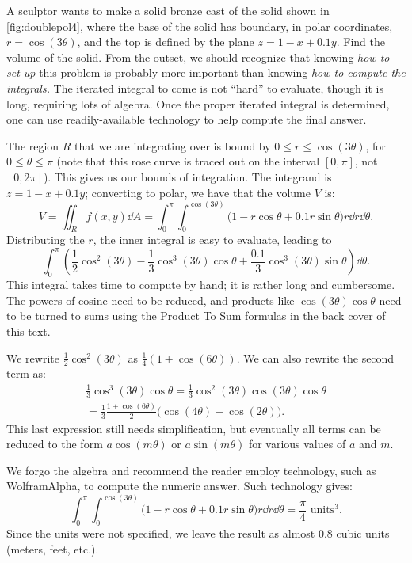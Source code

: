 \begin{example}\label{ex_doublepol4}%
A sculptor wants to make a solid bronze cast of the solid shown in \autoref{fig:doublepol4}, where the base of the solid has boundary, in polar coordinates, $r=\cos(3\theta)$, and the top is defined by the plane $z=1-x+0.1y$. Find the volume of the solid.
\solution
From the outset, we should recognize that knowing \emph{how to set up} this problem is probably more important than knowing \emph{how to compute the integrals.} The iterated integral to come is not ``hard'' to evaluate, though it is long, requiring lots of algebra. Once the proper iterated integral is determined, one can use readily-available technology to help compute the final answer. 

The region $R$ that we are integrating over is bound by $0\leq r\leq \cos(3\theta)$, for $0\leq \theta\leq\pi$ (note that this rose curve is traced out on the interval $[0,\pi]$, not $[0,2\pi]$). This gives us our bounds of integration. The integrand is $z=1-x+0.1y$; converting to polar, we have that the volume $V$ is:
\[V = \iint_R f(x,y)\dd A = \int_0^\pi\int_0^{\cos(3\theta)}\bigl(1-r\cos\theta+0.1r\sin\theta\bigr)r\dd r\dd\theta.\]
Distributing the $r$, the inner integral is easy to evaluate, leading to 
\[ \int_0^\pi \left(\frac12\cos^2(3\theta)-\frac13\cos^3(3\theta)\cos\theta
+\frac{0.1}3\cos^3(3\theta)\sin\theta\right)\dd\theta.\]
This integral takes time to compute by hand; it is rather long and cumbersome. The powers of cosine need to be reduced, and products like $\cos(3\theta)\cos\theta$ need to be turned to sums using the Product To Sum formulas in the back cover of this text. 

We rewrite $\frac12\cos^2(3\theta)$ as $\frac14(1+\cos(6\theta))$. We can also rewrite the second term as: 
\begin{multline*}
 \frac13\cos^3(3\theta)\cos\theta = \frac13\cos^2(3\theta)\cos(3\theta)\cos\theta\\
 = \frac13\frac{1+\cos(6\theta)}2\bigl(\cos(4\theta)+\cos(2\theta)\bigr).
\end{multline*}
This last expression still needs simplification, but eventually all terms can be reduced to the form $a\cos(m\theta)$ or $a\sin(m\theta)$ for various values of $a$ and $m$.

We forgo the algebra and recommend the reader employ technology, such as WolframAlpha\textregistered, to compute the numeric answer. Such technology gives:
\[\int_0^\pi\int_0^{\cos(3\theta)}\bigl(1-r\cos\theta+0.1r\sin\theta\bigr)r\dd r\dd\theta = \frac{\pi}{4} %
\text{ units}^3.\]
Since the units were not specified, we leave the result as almost $0.8$ cubic units (meters, feet, etc.).%
\end{example}


